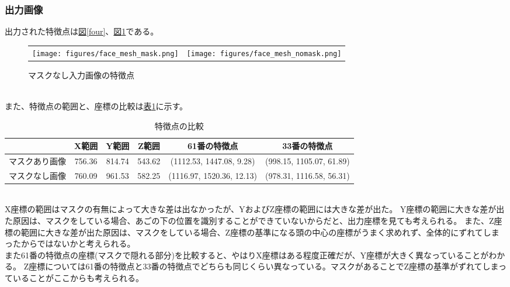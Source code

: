 \documentclass[]{jarticle}          %
\begin{document}
\subsubsection{出力画像}
出力された特徴点は\hyperref[four]{図\ref{four}}、\hyperref[five]{図\ref{five}}である。
\begin{figure}[!ht]
  \begin{tabular}{cc}
    \begin{minipage}[t]{0.45\hsize}
      \centering
      \texttt{[image: figures/face\_mesh\_mask.png]}
      \caption{マスクあり入力画像の特徴点}
      \label{four}
    \end{minipage} &
    \begin{minipage}[t]{0.45\hsize}
      \centering
      \texttt{[image: figures/face\_mesh\_nomask.png]}
      \caption{マスクなし入力画像の特徴点}
      \label{five}
    \end{minipage}
  \end{tabular}
\end{figure}
\\
また、特徴点の範囲と、座標の比較は\hyperref[six]{表\ref{six}}に示す。
\begin{table}[h]
  \centering
  \caption{特徴点の比較}
  \label{six}
  \begin{tabular}{|c|c|c|c|c|c|}
      \hline
       & X範囲 & Y範囲 & Z範囲 & 61番の特徴点 & 33番の特徴点 \\ \hline
      マスクあり画像 & 756.36 & 814.74 & 543.62 & (1112.53, 1447.08, 9.28) & (998.15, 1105.07, 61.89) \\ \hline
      マスクなし画像 & 760.09 & 961.53 & 582.25 & (1116.97, 1520.36, 12.13) &  (978.31, 1116.58, 56.31) \\ \hline
  \end{tabular}
\end{table}
\\
X座標の範囲はマスクの有無によって大きな差は出なかったが、YおよびZ座標の範囲には大きな差が出た。
Y座標の範囲に大きな差が出た原因は、マスクをしている場合、あごの下の位置を識別することができていないからだと、出力座標を見ても考えられる。
また、Z座標の範囲に大きな差が出た原因は、マスクをしている場合、Z座標の基準になる頭の中心の座標がうまく求めれず、全体的にずれてしまったからではないかと考えられる。\\
また61番の特徴点の座標(マスクで隠れる部分)を比較すると、やはりX座標はある程度正確だが、Y座標が大きく異なっていることがわかる。
Z座標については61番の特徴点と33番の特徴点でどちらも同じくらい異なっている。マスクがあることでZ座標の基準がずれてしまっていることがここからも考えられる。\\
\end{document}
